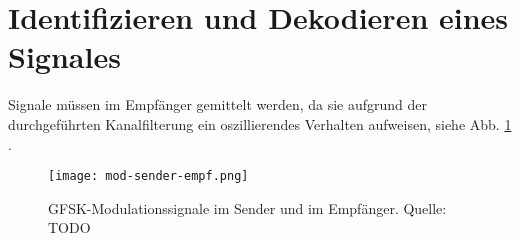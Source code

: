 \section{Identifizieren und Dekodieren eines Signales}
Signale müssen im Empfänger gemittelt werden, da sie aufgrund der durchgeführten Kanalfilterung ein oszillierendes Verhalten aufweisen, siehe Abb. \ref{mod-send-empf} \cite[vgl. Heuberger, e. a., S. TODO]{Heuberger:2017}.

\begin{figure}[ht]
	\centering
	\texttt{[image: mod-sender-empf.png]}
	\caption[GFSK-Modulationssignale im Sender und im Empfänger]{GFSK-Modulationssignale im Sender und im Empfänger. Quelle: TODO} %
	\label{mod-send-empf}
\end{figure}


\newpage
